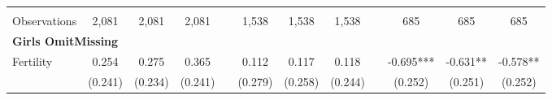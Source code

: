 \begin{landscape}
\begin{table}[htpb!]
\begin{center}
\begin{tabular}{lcccp{2mm}cccp{2mm}ccc}
\begin{footnotesize}\end{footnotesize}&\begin{footnotesize}\end{footnotesize}&\begin{footnotesize}\end{footnotesize}&\begin{footnotesize}\end{footnotesize}&\begin{footnotesize}\end{footnotesize}&\begin{footnotesize}\end{footnotesize}&\begin{footnotesize}\end{footnotesize}&\begin{footnotesize}\end{footnotesize}&\begin{footnotesize}\end{footnotesize}&\begin{footnotesize}\end{footnotesize}&\begin{footnotesize}\end{footnotesize}&\begin{footnotesize}\end{footnotesize}\\Observations&2,081&2,081&2,081&&1,538&1,538&1,538&&685&685&685\\
\multicolumn{12}{l}{\textbf{Girls OmitMissing}}\\ 
Fertility&0.254&0.275&0.365&&0.112&0.117&0.118&&-0.695***&-0.631**&-0.578**\\
&(0.241)&(0.234)&(0.241)&&(0.279)&(0.258)&(0.244)&&(0.252)&(0.251)&(0.252)\\

\end{tabular}
\end{center}
\end{table}
\end{landscape}
